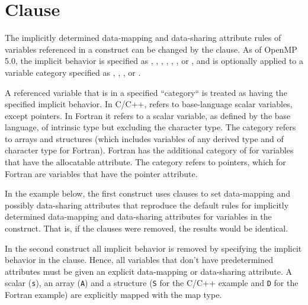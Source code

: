 \pagebreak
\section{ Clause}
\label{sec:defaultmap}

The implicitly determined data-mapping and data-sharing attribute
rules of variables referenced in a  construct can be
changed by the  clause. 
As of OpenMP 5.0, the implicit behavior is specified as
, , , ,
, ,  or ,
and is optionally applied to a variable category specified as , , ,
or . 

A referenced variable that is in a specified ``category`` is treated as having
the specified implicit behavior. In C/C++,  refers to
base-language scalar variables, except pointers.  In Fortran it refers to a
scalar variable, as defined by the base language, of intrinsic type but
excluding the character type. The  category refers to arrays and
structures (which includes variables of any derived type and of character type for Fortran). Fortran
has the additional category of  for variables that have the
allocatable attribute. The  category refers to pointers, which
for Fortran are variables that have the pointer attribute.

In the example below, the first  construct uses  
clauses to set data-mapping and possibly data-sharing attributes that reproduce 
the default rules for implicitly determined data-mapping and data-sharing
attributes for variables in the construct. That is, if the 
clauses were removed, the results would be identical.

In the second  construct all implicit behavior is removed
by specifying the  implicit behavior in the  clause.
Hence, all variables that don't have predetermined attributes must be given an
explicit data-mapping or data-sharing attribute. A scalar (\texttt{s}), an
array (\texttt{A}) and a structure (\texttt{S} for the C/C++ example and
\texttt{D} for the Fortran example) are explicitly mapped with the
 map type.

